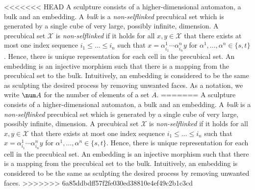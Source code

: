 <<<<<<< HEAD
    A sculpture consists of a higher-dimensional automaton, a bulk and an embedding. A \emph{bulk} is a \emph{non-selflinked} precubical set which is generated by a single cube of very large, possibly infinite, dimension. A precubical set $\mathcal{X}$ is \emph{non-selflinked} if it holds for all $x, y\in \mathcal{X}$ that there exists at most one index sequence $i_1\le\dotsc\le i_n$ such that $x= \alpha^1_{ i_1}\dotsm \alpha^n_{ i_n} y$ for $\alpha^1,\dotsc, \alpha^n\in\{ s, t\}$. Hence, there is unique representation for each cell in the precubical set. An embedding is an injective morphism such that there is a mapping from the precubical set to the bulk. Intuitively, an embedding is considered to be the same as sculpting the desired process by removing unwanted faces. As a notation, we write $\num A$ for the number of elements of a set $A$. 
=======
    A sculpture consists of a higher-dimensional automaton, a bulk and an embedding. A \emph{bulk} is a \emph{non-selflinked} precubical set which is generated by a single cube of very large, possibly infinite, dimension. A precubical set $\mathcal{X}$ is \emph{non-selflinked} if it holds for all $x, y\in \mathcal{X}$ that there exists at most one index sequence $i_1\le\dotsc\le i_n$ such that $x= \alpha^1_{ i_1}\dotsm \alpha^n_{ i_n} y$ for $\alpha^1,\dotsc, \alpha^n\in\{ s, t\}$. Hence, there is unique representation for each cell in the precubical set. An embedding is an injective morphism such that there is a mapping from the precubical set to the bulk. Intuitively, an embedding is considered to be the same as sculpting the desired process by removing unwanted faces.
>>>>>>> 6a85ddbdff57f2fe030ed38810e4ef49c2b1c3cd
    
    
    
    

    
    

